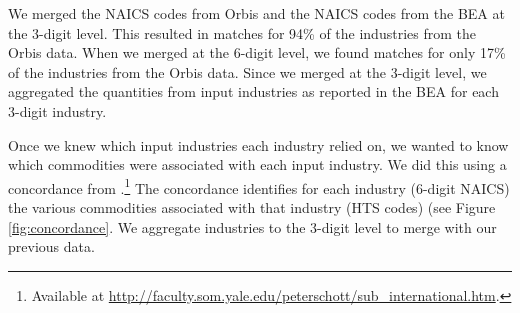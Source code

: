 We merged the NAICS codes from Orbis and the NAICS codes from the BEA at the 3-digit level. This resulted in matches for 94\% of the industries from the Orbis data. When we merged at the 6-digit level, we found matches for only 17\% of the industries from the Orbis data. Since we merged at the 3-digit level, we aggregated the quantities from input industries as reported in the BEA for each 3-digit industry.

Once we knew which input industries each industry relied on, we wanted to know which commodities were associated with each input industry. We did this using a concordance from \cite{pierce2009concording}.\footnote{Available at \url{http://faculty.som.yale.edu/peterschott/sub_international.htm}.} The concordance identifies for each industry (6-digit NAICS) the various commodities associated with that industry (HTS codes) (see Figure \ref{fig:concordance}. We aggregate industries to the 3-digit level to merge with our previous data.

